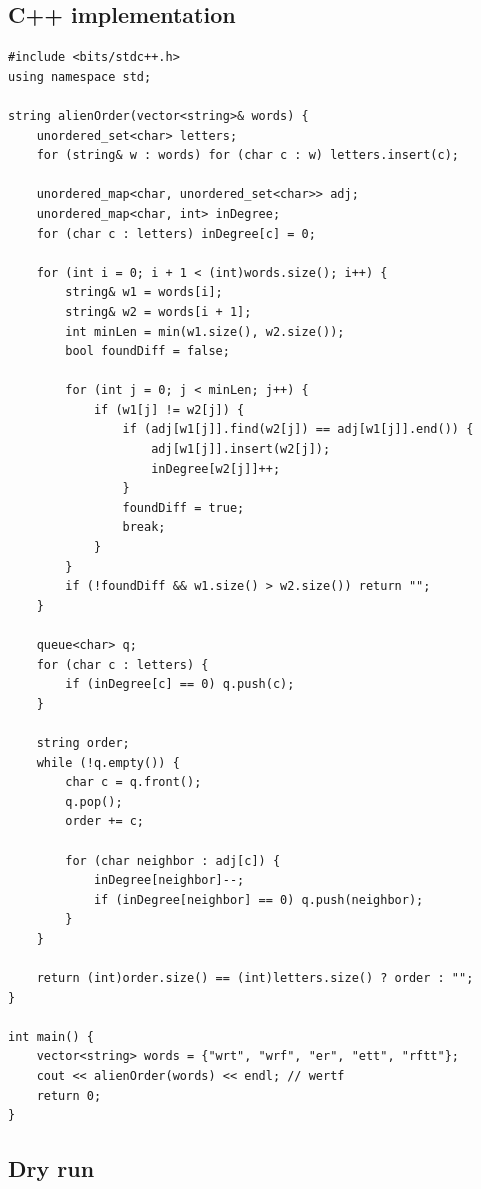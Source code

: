 \subsection*{C++ implementation}

\begin{lstlisting}
#include <bits/stdc++.h>
using namespace std;

string alienOrder(vector<string>& words) {
    unordered_set<char> letters;
    for (string& w : words) for (char c : w) letters.insert(c);

    unordered_map<char, unordered_set<char>> adj;
    unordered_map<char, int> inDegree;
    for (char c : letters) inDegree[c] = 0;

    for (int i = 0; i + 1 < (int)words.size(); i++) {
        string& w1 = words[i];
        string& w2 = words[i + 1];
        int minLen = min(w1.size(), w2.size());
        bool foundDiff = false;

        for (int j = 0; j < minLen; j++) {
            if (w1[j] != w2[j]) {
                if (adj[w1[j]].find(w2[j]) == adj[w1[j]].end()) {
                    adj[w1[j]].insert(w2[j]);
                    inDegree[w2[j]]++;
                }
                foundDiff = true;
                break;
            }
        }
        if (!foundDiff && w1.size() > w2.size()) return "";
    }

    queue<char> q;
    for (char c : letters) {
        if (inDegree[c] == 0) q.push(c);
    }

    string order;
    while (!q.empty()) {
        char c = q.front();
        q.pop();
        order += c;

        for (char neighbor : adj[c]) {
            inDegree[neighbor]--;
            if (inDegree[neighbor] == 0) q.push(neighbor);
        }
    }

    return (int)order.size() == (int)letters.size() ? order : "";
}

int main() {
    vector<string> words = {"wrt", "wrf", "er", "ett", "rftt"};
    cout << alienOrder(words) << endl; // wertf
    return 0;
}
\end{lstlisting}

\subsection*{Dry run}


